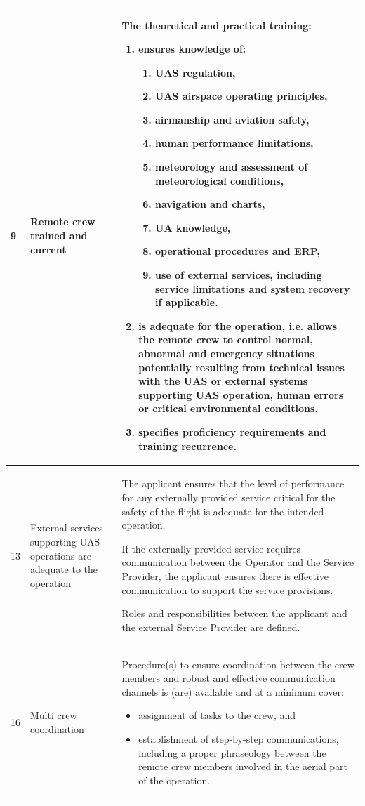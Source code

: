 \begin{longtable}{|p{0.5cm}|p{3cm}|p{\dimexpr\textwidth-3.5cm-6\tabcolsep-4\arrayrulewidth\relax}|}
9 & Remote crew trained and current 
& The theoretical and practical training:
\begin{enumerate}
    \item ensures knowledge of:
    \begin{enumerate}
        \item UAS regulation,
        \item UAS airspace operating principles,
        \item airmanship and aviation safety,
        \item human performance limitations,
        \item meteorology and assessment of meteorological conditions,
        \item navigation and charts,
        \item UA knowledge,
        \item operational procedures and ERP,
        \item use of external services, including service limitations and system recovery if applicable.
    \end{enumerate}
    \item is adequate for the operation, i.e. allows the remote crew to control normal, abnormal and emergency situations potentially resulting from technical issues with the UAS or external systems supporting UAS operation, human errors or critical environmental conditions.
    \item specifies proficiency requirements and training recurrence.
\end{enumerate}
\\ \hline

13 & External services supporting UAS operations are adequate to the operation & The applicant ensures that the level of performance for any externally provided service critical for the safety of the flight is adequate for the intended operation.

If the externally provided service requires communication between the Operator and the Service Provider, the applicant ensures there is effective communication to support the service provisions. 

Roles and responsibilities between the applicant and the external Service Provider are defined. \\ \hline

16 & Multi crew coordination & Procedure(s) to ensure coordination between the crew members and robust and effective communication channels is (are) available and at a minimum cover:
\begin{itemize}
\item assignment of tasks to the crew, and
\item establishment of step-by-step communications, including a proper phraseology between the remote crew members involved in the aerial part of the operation.
\end{itemize}


\end{longtable}

